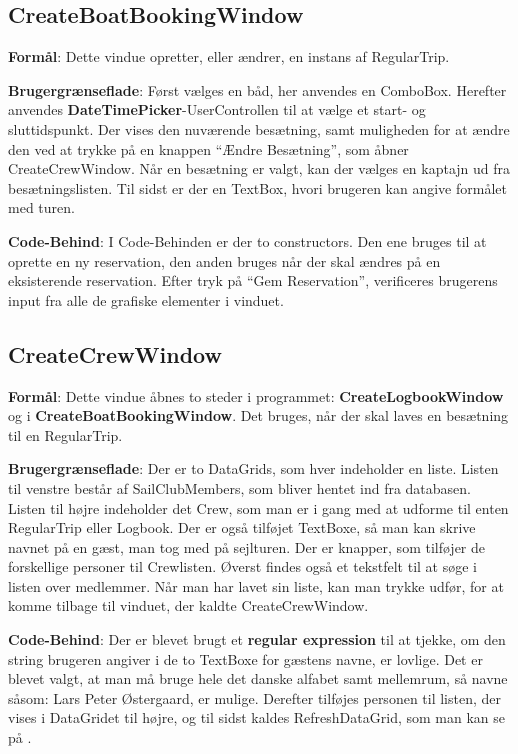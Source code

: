 \subsection{CreateBoatBookingWindow}
\textbf{Formål}: 
Dette vindue opretter, eller ændrer, en instans af RegularTrip.

\textbf{Brugergrænseflade}: 
Først vælges en båd, her anvendes en ComboBox.
Herefter anvendes \textbf{DateTimePicker}-UserControllen til at vælge et start- og sluttidspunkt.
Der vises den nuværende besætning, samt muligheden for at ændre den ved at trykke på en knappen ``Ændre Besætning'', som åbner CreateCrewWindow.
Når en besætning er valgt, kan der vælges en kaptajn ud fra besætningslisten.
Til sidst er der en TextBox, hvori brugeren kan angive formålet med turen.

\textbf{Code-Behind}: 
I Code-Behinden er der to constructors. 
Den ene bruges til at oprette en ny reservation, den anden bruges når der skal ændres på en eksisterende reservation. 
Efter tryk på ``Gem Reservation'', verificeres brugerens input fra alle de grafiske elementer i vinduet.

\subsection{CreateCrewWindow}

\textbf{Formål}: Dette vindue åbnes to steder i programmet: \textbf{CreateLogbookWindow} og i \textbf{CreateBoatBookingWindow}. 
Det bruges, når der skal laves en besætning til en RegularTrip.  

\textbf{Brugergrænseflade}: 
Der er to DataGrids, som hver indeholder en liste. 
Listen til venstre består af SailClubMembers, som bliver hentet ind fra databasen. 
Listen til højre indeholder det Crew, som man er i gang med at udforme til enten RegularTrip eller Logbook. 
Der er også tilføjet TextBoxe, så man kan skrive navnet på en gæst, man tog med på sejlturen. 
Der er knapper, som tilføjer de forskellige personer til Crewlisten. 
Øverst findes også et tekstfelt til at søge i listen over medlemmer. 
Når man har lavet sin liste, kan man trykke udfør, for at komme tilbage til vinduet, der kaldte CreateCrewWindow.

\textbf{Code-Behind}: 
Der er blevet brugt et \textbf{regular expression} til at tjekke, om den string brugeren angiver i de to TextBoxe for gæstens navne, er lovlige. 
Det er blevet valgt, at man må bruge hele det danske alfabet samt mellemrum, så navne såsom: Lars Peter Østergaard, er mulige.
Derefter tilføjes personen til listen, der vises i DataGridet til højre, og til sidst kaldes RefreshDataGrid, som man kan se på .

